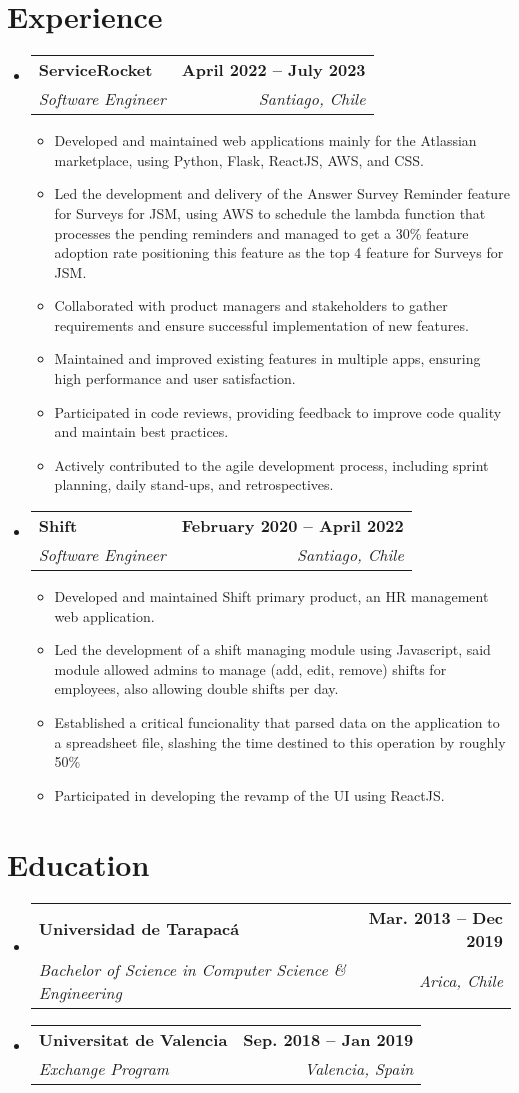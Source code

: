 \documentclass[letterpaper,11pt]{article}
\makeatletter
\newcommand{\resumeItem}[1]{
  \item\small{
    {#1 \vspace{-2pt}}
  }
}
\newcommand{\resumeSubheading}[4]{
  \vspace{-2pt}\item
    \begin{tabular*}{1.0\textwidth}[t]{l@{\extracolsep{\fill}}r}
      \textbf{#1} & \textbf{\small #2} \\
      \textit{\small#3} & \textit{\small #4} \\
    \end{tabular*}\vspace{-7pt}
}
\newcommand{\resumeSubHeadingListStart}{\begin{itemize}[leftmargin=0.0in, label={}]}
\newcommand{\resumeSubHeadingListEnd}{\end{itemize}}
\newcommand{\resumeItemListStart}{\begin{itemize}}
\newcommand{\resumeItemListEnd}{\end{itemize}\vspace{-5pt}}
\makeatother
\begin{document}
\section{Experience}
  \resumeSubHeadingListStart

    \resumeSubheading
      {ServiceRocket}{April 2022 -- July 2023}
      {Software Engineer}{Santiago, Chile}
      \resumeItemListStart
        \resumeItem{Developed and maintained web applications mainly for the Atlassian marketplace,
        using Python, Flask, ReactJS, AWS, and CSS.}
        \resumeItem{Led the development and delivery of the Answer Survey Reminder feature for
        Surveys for JSM, using AWS to schedule the lambda function that processes the 
        pending reminders and managed to get a 30\% feature adoption rate positioning this feature
        as the top 4 feature for Surveys for JSM.}
        \resumeItem{Collaborated with product managers and stakeholders to gather requirements
        and ensure successful implementation of new features.}
        \resumeItem{Maintained and improved existing features in multiple apps, ensuring high
        performance and user satisfaction.}
        \resumeItem{Participated in code reviews, providing feedback to improve code quality and
        maintain best practices.}
        \resumeItem{Actively contributed to the agile development process, including sprint
        planning, daily stand-ups, and retrospectives.}
      \resumeItemListEnd
    \resumeSubheading
      {Shift}{February 2020 -- April 2022}
      {Software Engineer}{Santiago, Chile}
      \resumeItemListStart
      	\resumeItem{Developed and maintained Shift primary product, an HR management web application.}
        \resumeItem{Led the development of a shift managing module using Javascript, said module
        allowed admins to manage (add, edit, remove) shifts for employees, also allowing double 
        shifts per day.}
        \resumeItem{Established a critical funcionality that parsed data on the application to a
        spreadsheet file, slashing the time destined to this operation by roughly 50\%}
        \resumeItem{Participated in developing the revamp of the UI using ReactJS.}
      \resumeItemListEnd  
  \resumeSubHeadingListEnd
\vspace{-16pt}


\section{Education}
  \resumeSubHeadingListStart
    \resumeSubheading
      {Universidad de Tarapacá}{Mar. 2013 -- Dec 2019}
      {Bachelor of Science in Computer Science \& Engineering}{Arica, Chile}
    \resumeSubheading
      {Universitat de Valencia}{Sep. 2018 -- Jan 2019}
      {Exchange Program}{Valencia, Spain}
  \resumeSubHeadingListEnd
\end{document}

